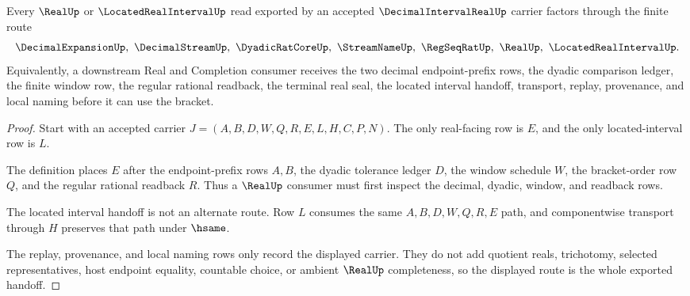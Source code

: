 \begin{theorem}
\label{thm:decimal-interval-real-real-seal-handoff}
Every $\RealUp$ or $\LocatedRealIntervalUp$ read exported by an accepted $\DecimalIntervalRealUp$ carrier factors through the finite route
$$
\DecimalExpansionUp,\ \DecimalStreamUp,\ \DyadicRatCoreUp,\ \StreamNameUp,\ \RegSeqRatUp,\ \RealUp,\ \LocatedRealIntervalUp .
$$
Equivalently, a downstream Real and Completion consumer receives the two decimal endpoint-prefix rows, the dyadic comparison ledger, the finite window row, the regular rational readback, the terminal real seal, the located interval handoff, transport, replay, provenance, and local naming before it can use the bracket.
\end{theorem}
\begin{proof}
Start with an accepted carrier $J=(A,B,D,W,Q,R,E,L,H,C,P,N)$. The only real-facing row is $E$, and the only located-interval row is $L$.

The definition places $E$ after the endpoint-prefix rows $A,B$, the dyadic tolerance ledger $D$, the window schedule $W$, the bracket-order row $Q$, and the regular rational readback $R$. Thus a $\RealUp$ consumer must first inspect the decimal, dyadic, window, and readback rows.

The located interval handoff is not an alternate route. Row $L$ consumes the same $A,B,D,W,Q,R,E$ path, and componentwise transport through $H$ preserves that path under $\hsame$.

The replay, provenance, and local naming rows only record the displayed carrier. They do not add quotient reals, trichotomy, selected representatives, host endpoint equality, countable choice, or ambient $\RealUp$ completeness, so the displayed route is the whole exported handoff.
\end{proof}



